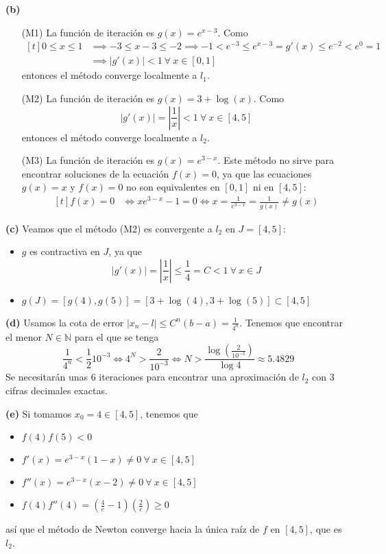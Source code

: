 \documentclass[12pt]{report}
\newcommand{\N}{\mathbb N}
\begin{document}
\vspace{2mm}
\textbf{(b) }
\begin{itemize}
    \item[(M1)] La función de iteración es $g(x) = e^{x-3}$. Como
    \[
    \begin{aligned}[t]
        0 \leq x \leq 1 &\implies -3 \leq x-3 \leq -2 \implies -1 < e^{-3} \leq e^{x-3} = g'(x) \leq e^{-2} < e^0 = 1 \\
        &\implies |g'(x)| < 1 \ \forall \ x \in [0,1]
    \end{aligned}
    \]
    entonces el método converge localmente a $l_1$.
    \item[(M2)] La función de iteración es $g(x) = 3 + \log(x)$. Como
    \[|g'(x)| = |\frac{1}{x}| < 1 \ \forall \ x  \in [4,5]\]
    entonces el método converge localmente a $l_2$.
    \item[(M3)] La función de iteración es $g(x) = e^{3-x}$. Este método no sirve para encontrar soluciones de la ecuación $f(x) = 0$, ya que las ecuaciones $g(x) = x$ y $f(x) = 0$ no son equivalentes en $[0,1]$ ni en $[4,5]$:
    \[
    \begin{aligned}[t]
         f(x) = 0 &\iff xe^{3-x} -1 = 0 \iff x = \frac{1}{e^{3-x}} = \frac{1}{g(x)} \neq g(x)
    \end{aligned}
    \]
\end{itemize}

\vspace{2mm}
\textbf{(c) } Veamos que el método (M2) es convergente a $l_2$ en $J = [4,5]$:
\begin{itemize}
    \item $g$ es contractiva en $J$, ya que
    \[|g'(x)| = |\frac{1}{x}| \leq \frac{1}{4} = C < 1 \ \forall \ x \in J\]
    \item $g(J) = [g(4),g(5)] = [3+\log(4),3+\log(5)] \subset [4,5]$
\end{itemize}

\vspace{2mm}
\textbf{(d) } Usamos la cota de error $|x_n-l| \leq C^n(b-a) = \frac{1}{4^n}$. Tenemos que encontrar el menor $N \in \N$ para el que se tenga
\[\frac{1}{4^n} < \frac{1}{2}10^{-3} \iff 4^N > \frac{2}{10^{-3}} \iff N > \frac{\log(\frac{2}{10^{-3}})}{\log{4}} \approx 5.4829\]
Se necesitarán unas 6 iteraciones para encontrar una aproximación de $l_2$ con 3 cifras decimales exactas.

\vspace{2mm}
\textbf{(e) } Si tomamos $x_0 = 4 \in [4,5]$, tenemos que
\begin{itemize}
    \item $f(4)f(5) < 0$
    \item $f'(x) = e^{3-x}(1-x) \neq 0 \ \forall \ x \in [4,5]$
    \item $f''(x) = e^{3-x}(x-2) \neq 0 \ \forall \ x \in [4,5]$
    \item $\displaystyle f(4)f''(4) = (\frac{4}{e}-1)(\frac{2}{e}) \geq 0$
\end{itemize}
así que el método de Newton converge hacia la única raíz de $f$ en $[4,5]$, que es $l_2$.
\end{document}
